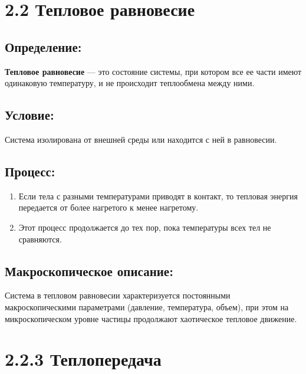 \documentclass[a4paper,12pt]{article}
\begin{document}
\section*{2.2 Тепловое равновесие}
\vspace{-9pt}
\subsection*{Определение:}
\vspace{-3pt}
\textbf{Тепловое равновесие} — это состояние системы, при котором все ее части имеют одинаковую температуру, и не происходит теплообмена между ними.

\vspace{-9pt}
\subsection*{Условие:}
\vspace{-3pt}
Система изолирована от внешней среды или находится с ней в равновесии.

\vspace{-9pt}
\subsection*{Процесс:}
\vspace{-3pt}
\begin{enumerate}[itemsep=0pt, topsep=0pt, parsep=3pt]
    \item Если тела с разными температурами приводят в контакт, то тепловая энергия передается от более нагретого к менее нагретому.
    \item Этот процесс продолжается до тех пор, пока температуры всех тел не сравняются.
\end{enumerate}

\vspace{-9pt}
\subsection*{Макроскопическое описание:}
\vspace{-3pt}
Система в тепловом равновесии характеризуется постоянными макроскопическими параметрами (давление, температура, объем), при этом на микроскопическом уровне частицы продолжают хаотическое тепловое движение.


\section*{2.2.3 Теплопередача}
\vspace{-9pt}
\end{document}
